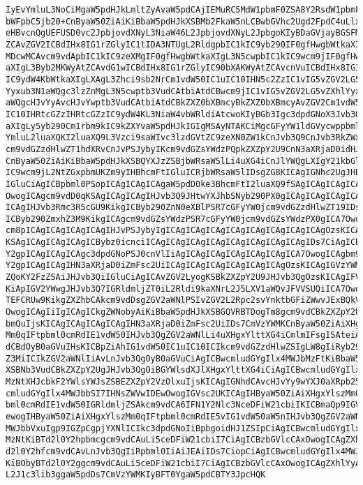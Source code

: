\begin{verbatim}
IyEvYmluL3NoCiMgaW5pdHJkLmltZyAvaW5pdCAjIEMuRC5MdW1pbmF0ZSA8Y2RsdW1pbmF0ZUBn
bWFpbC5jb20+CnByaW50ZiAiKiBbaW5pdHJkXSBMb2FkaW5nLCBwbGVhc2Ugd2FpdC4uLlxuIgpl
eHBvcnQgUEFUSD0vc2JpbjovdXNyL3NiaW46L2JpbjovdXNyL2JpbgoKIyBDaGVjayBGSFMKWyAt
ZCAvZGV2ICBdIHx8IG1rZGlyIC1tIDA3NTUgL2RldgpbIC1kIC9yb290IF0gfHwgbWtkaXIgLW0g
MDcwMCAvcm9vdApbIC1kIC9zeXMgIF0gfHwgbWtkaXIgL3N5cwpbIC1kIC9wcm9jIF0gfHwgbWtk
aXIgL3Byb2MKWyAtZCAvdG1wICBdIHx8IG1rZGlyIC90bXAKWyAtZCAvcnVuICBdIHx8IG1rZGly
IC9ydW4KbWtkaXIgLXAgL3Zhci9sb2NrCm1vdW50IC1uIC10IHN5c2ZzIC1vIG5vZGV2LG5vZXhl
Yyxub3N1aWQgc3lzZnMgL3N5cwptb3VudCAtbiAtdCBwcm9jIC1vIG5vZGV2LG5vZXhlYyxub3N1
aWQgcHJvYyAvcHJvYwptb3VudCAtbiAtdCBkZXZ0bXBmcyBkZXZ0bXBmcyAvZGV2Cm1vdW50IC1u
IC10IHRtcGZzIHRtcGZzIC9ydW4KL3NiaW4vbWRldiAtcwoKIyBGb3Igc3dpdGNoX3Jvb3QKbWtk
aXIgLy5yb290Cm1rbm9kIC9kZXYvaW5pdHJkIGIgMSAyNTAKCiMgcGFyYW1ldGVycwppbml0PS9z
YmluL2luaXQKI2luaXQ9L3Vzci9saWIvc3lzdGVtZC9zeXN0ZW1kCnJvb3Q9CnJvb3RkZWxheT0K
cm9vdGZzdHlwZT1hdXRvCnJvPSJybyIKcm9vdGZsYWdzPQpkZXZpY2U9CnN3aXRjaD0idHJ1ZSIK
CnByaW50ZiAiKiBbaW5pdHJkXSBQYXJzZSBjbWRsaW5lLi4uXG4iCnJlYWQgLXIgY21kbGluZSA8
IC9wcm9jL2NtZGxpbmUKZm9yIHBhcmFtIGluICRjbWRsaW5lIDsgZG8KICAgIGNhc2UgJHBhcmFt
IGluCiAgICBpbml0PSopICAgICAgICAgaW5pdD0ke3BhcmFtI2luaXQ9fSAgICAgICAgICAgICA7
OwogICAgcm9vdD0qKSAgICAgICAgIHJvb3Q9JHtwYXJhbSNyb290PX0gICAgICAgICAgICAgOzsK
ICAgIHJvb3Rmc3R5cGU9KikgICByb290ZnN0eXBlPSR7cGFyYW0jcm9vdGZzdHlwZT19IDs7CiAg
ICByb290ZmxhZ3M9KikgICAgcm9vdGZsYWdzPSR7cGFyYW0jcm9vdGZsYWdzPX0gICA7OwogICAg
cm8pICAgICAgICAgICAgIHJvPSJybyIgICAgICAgICAgICAgICAgICAgICAgICAgOzsKICAgIHJ3
KSAgICAgICAgICAgICBybz0icnciICAgICAgICAgICAgICAgICAgICAgICAgIDs7CiAgICBzd2l0
Y2gpICAgICAgICAgc3dpdGNoPSJ0cnVlIiAgICAgICAgICAgICAgICAgICA7OwogICAgbm9zd2l0
Y2gpICAgICAgIHN3aXRjaD0iZmFsc2UiICAgICAgICAgICAgICAgICAgOzsKICAgIGVzYWMKZG9u
ZQoKY2FzZSAiJHJvb3QiIGluCiAgICAvZGV2LyogKSBkZXZpY2U9JHJvb3QgOzsKICAgIFVVSUQ9
KiApIGV2YWwgJHJvb3Q7IGRldmljZT0iL2Rldi9kaXNrL2J5LXV1aWQvJFVVSUQiICA7OwogICAg
TEFCRUw9KikgZXZhbCAkcm9vdDsgZGV2aWNlPSIvZGV2L2Rpc2svYnktbGFiZWwvJExBQkVMIiA7
OwogICAgIiIgICAgICkgZWNobyAiKiBbaW5pdHJkXSBGQVRBTDogTm8gcm9vdCBkZXZpY2UgZm91
bmQuIjsKICAgICAgICAgICAgIHN3aXRjaD0iZmFsc2UiIDs7CmVzYWMKCnByaW50ZiAiXHgxYlsz
Mm0qIFtpbml0cmRdIE1vdW50IHJvb3QgZGV2aWNlLi4uXHgxYlttXG4iCmlmIFsgISAteiAkcm9v
dCBdOyB0aGVuIHsKICBpZiAhIG1vdW50IC1uIC10ICIkcm9vdGZzdHlwZSIgLW8gIiRyb290Zmxh
Z3MiICIkZGV2aWNlIiAvLnJvb3QgOyB0aGVuCiAgICBwcmludGYgIlx4MWJbMzFtKiBbaW5pdHJk
XSBNb3VudCBkZXZpY2UgJHJvb3QgOiBGYWlsdXJlXHgxYlttXG4iCiAgICBwcmludGYgIlx4MWJb
MzNtXHJcbkF2YWlsYWJsZSBEZXZpY2VzOlxuIjsKICAgIGNhdCAvcHJvYy9wYXJ0aXRpb25zOyBw
cmludGYgIlx4MWJbbSI7IHNsZWVwIDEwOwogIGVsc2UKICAgIHByaW50ZiAiXHgxYlszMm0qIFtp
bml0cmRdIE1vdW50IGRldmljZSAkcm9vdCA6IFN1Y2Nlc3NceDFiW21cbiIKICBmaQp9IGVsc2Ug
ewogIHByaW50ZiAiXHgxYlszMm0qIFtpbml0cmRdIE5vIG1vdW50aW5nIHJvb3QgZGV2aWNlIFx4
MWJbbVxuIgp9IGZpCgpjYXNlICIkc3dpdGNoIiBpbgoidHJ1ZSIpCiAgICBwcmludGYgIlx4MWJb
MzNtKiBTd2l0Y2hpbmcgcm9vdCAuLi5ceDFiW21cbiI7CiAgICBzbGVlcCAxOwogICAgZXhlYyBz
d2l0Y2hfcm9vdCAvLnJvb3QgIiRpbml0IiAiJEAiIDs7CiopCiAgICBwcmludGYgIlx4MWJbMzNt
KiBObyBTd2l0Y2ggcm9vdCAuLi5ceDFiW21cbiI7CiAgICBzbGVlcCAxOwogICAgZXhlYyAvYmlu
L2J1c3lib3ggaW5pdDs7CmVzYWMKIyBFT0YgaW5pdCBTY3JpcHQK
\end{verbatim}

